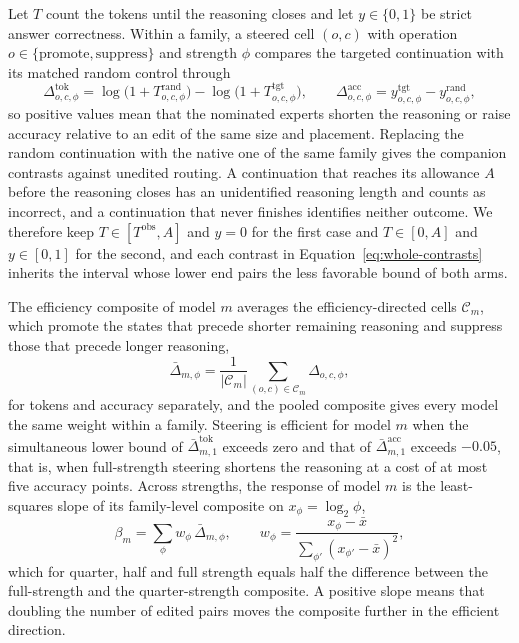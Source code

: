 Let $T$ count the tokens until the reasoning closes and let $y\in\{0,1\}$ be strict answer correctness.
%
Within a family, a steered cell $(o,c)$ with operation $o\in\{\mathrm{promote},\mathrm{suppress}\}$ and strength $\phi$ compares the targeted continuation with its matched random control through
\begin{equation}
 \Delta^{\mathrm{tok}}_{o,c,\phi}=\log\bigl(1+T^{\mathrm{rand}}_{o,c,\phi}\bigr)-\log\bigl(1+T^{\mathrm{tgt}}_{o,c,\phi}\bigr),\qquad
 \Delta^{\mathrm{acc}}_{o,c,\phi}=y^{\mathrm{tgt}}_{o,c,\phi}-y^{\mathrm{rand}}_{o,c,\phi},
 \label{eq:whole-contrasts}
\end{equation}
so positive values mean that the nominated experts shorten the reasoning or raise accuracy relative to an edit of the same size and placement.
%
Replacing the random continuation with the native one of the same family gives the companion contrasts against unedited routing.
%
A continuation that reaches its allowance $A$ before the reasoning closes has an unidentified reasoning length and counts as incorrect, and a continuation that never finishes identifies neither outcome.
%
We therefore keep $T\in[T^{\mathrm{obs}},A]$ and $y=0$ for the first case and $T\in[0,A]$ and $y\in[0,1]$ for the second, and each contrast in Equation~\eqref{eq:whole-contrasts} inherits the interval whose lower end pairs the less favorable bound of both arms.
%

The efficiency composite of model $m$ averages the efficiency-directed cells $\mathcal C_m$, which promote the states that precede shorter remaining reasoning and suppress those that precede longer reasoning,
\begin{equation}
 \bar\Delta_{m,\phi}=\frac{1}{|\mathcal C_m|}\sum_{(o,c)\in\mathcal C_m}\Delta_{o,c,\phi},
 \label{eq:whole-composite}
\end{equation}
for tokens and accuracy separately, and the pooled composite gives every model the same weight within a family.
%
Steering is efficient for model $m$ when the simultaneous lower bound of $\bar\Delta^{\mathrm{tok}}_{m,1}$ exceeds zero and that of $\bar\Delta^{\mathrm{acc}}_{m,1}$ exceeds $-0.05$, that is, when full-strength steering shortens the reasoning at a cost of at most five accuracy points.
%
Across strengths, the response of model $m$ is the least-squares slope of its family-level composite on $x_\phi=\log_2\phi$,
\begin{equation}
 \beta_m=\sum_{\phi} w_\phi\,\bar\Delta_{m,\phi},\qquad w_\phi=\frac{x_\phi-\bar x}{\sum_{\phi'}(x_{\phi'}-\bar x)^2},
 \label{eq:whole-slope}
\end{equation}
which for quarter, half and full strength equals half the difference between the full-strength and the quarter-strength composite.
%
A positive slope means that doubling the number of edited pairs moves the composite further in the efficient direction.
%

